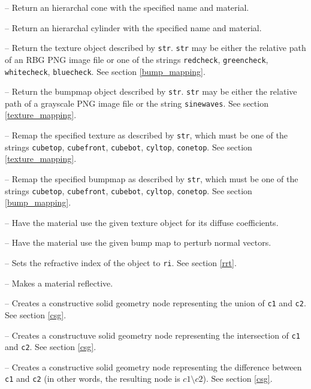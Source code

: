 \documentclass{article}
\begin{document}
\begin{itemize}

   -- Return an hierarchal cone with the
  specified name and material.

   -- Return an hierarchal cylinder with the
  specified name and material.

   -- Return the texture object described by {\tt str}.
  {\tt str} may be either the relative path of an RBG PNG image file or one of the
  strings {\tt redcheck}, {\tt greencheck}, {\tt whitecheck}, {\tt bluecheck}. See section
  \ref{bump_mapping}.

   -- Return the bumpmap object described by {\tt str}.
  {\tt str} may be either the relative path of a grayscale PNG image file or the
  string {\tt sinewaves}. See section \ref{texture_mapping}.

   -- Remap the specified texture as described by
  {\tt str}, which must be one of the strings {\tt cubetop}, {\tt cubefront}, {\tt cubebot},
  {\tt cyltop}, {\tt conetop}. See section \ref{texture_mapping}.

   -- Remap the specified bumpmap as described by
  {\tt str}, which must be one of the strings {\tt cubetop}, {\tt cubefront},
  {\tt cubebot},
  {\tt cyltop}, {\tt conetop}. See section \ref{bump_mapping}.

   -- Have the material use the given
  texture object for its diffuse coefficients.

   -- Have the material use the given
  bump map to perturb normal vectors.

   -- Sets the refractive index of the object to
  {\tt ri}. See section \ref{rrt}.

   -- Makes a material reflective.

   -- Creates a constructive solid geometry node representing
  the union of {\tt c1} and {\tt c2}. See section \ref{csg}.

   -- Creates a constructuve solid geometry node
  representing the intersection of {\tt c1} and {\tt c2}. See section
  \ref{csg}.

   -- Creates a constructive solid geometry node
  representing the difference between {\tt c1} and {\tt c2} (in other words, the
  resulting node is $c1 \setminus c2$). See section
  \ref{csg}.


\end{itemize}
\end{document}
